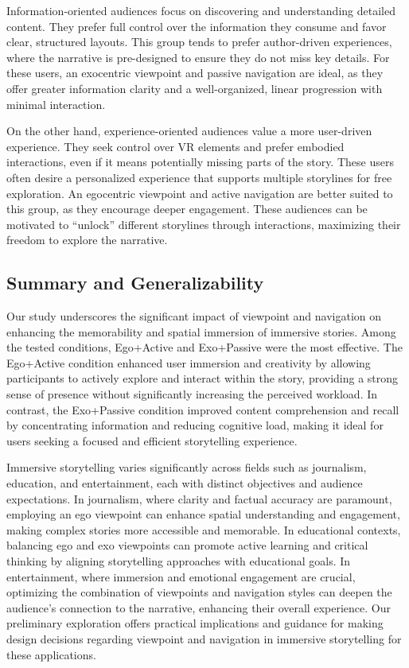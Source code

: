Information-oriented audiences focus on discovering and understanding detailed content. They prefer full control over the information they consume and favor clear, structured layouts. This group tends to prefer author-driven experiences, where the narrative is pre-designed to ensure they do not miss key details. For these users, an exocentric viewpoint and passive navigation are ideal, as they offer greater information clarity and a well-organized, linear progression with minimal interaction.

On the other hand, experience-oriented audiences value a more user-driven experience. They seek control over VR elements and prefer embodied interactions, even if it means potentially missing parts of the story. These users often desire a personalized experience that supports multiple storylines for free exploration. An egocentric viewpoint and active navigation are better suited to this group, as they encourage deeper engagement. These audiences can be motivated to ``unlock'' different storylines through interactions, maximizing their freedom to explore the narrative.

{\subsection{Summary and Generalizability}}
{Our study underscores the significant impact of viewpoint and navigation on enhancing the memorability and spatial immersion of immersive stories. 
Among the tested conditions, Ego+Active and Exo+Passive were the most effective. The Ego+Active condition enhanced user immersion and creativity by allowing participants to actively explore and interact within the story, providing a strong sense of presence without significantly increasing the perceived workload. 
In contrast, the Exo+Passive condition improved content comprehension and recall by concentrating information and reducing cognitive load, making it ideal for users seeking a focused and efficient storytelling experience.}

{Immersive storytelling varies significantly across fields such as journalism, education, and entertainment, each with distinct objectives and audience expectations. 
In journalism, where clarity and factual accuracy are paramount, employing an ego viewpoint can enhance spatial understanding and engagement, making complex stories more accessible and memorable. 
In educational contexts, balancing ego and exo viewpoints can promote active learning and critical thinking by aligning storytelling approaches with educational goals. 
In entertainment, where immersion and emotional engagement are crucial, optimizing the combination of viewpoints and navigation styles can deepen the audience's connection to the narrative, enhancing their overall experience. 
Our preliminary exploration offers practical implications and guidance for making design decisions regarding viewpoint and navigation in immersive storytelling for these applications.}


